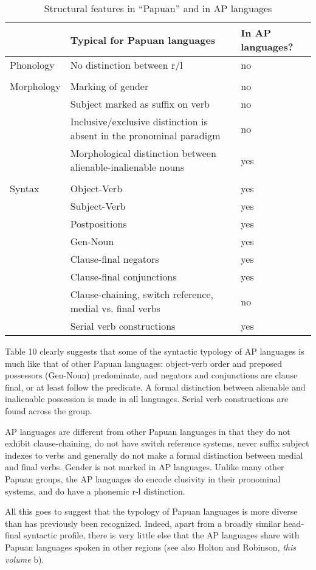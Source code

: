 \begin{table}
\begin{tabular}{lp{4cm}p{4cm}} & {Typical for Papuan languages} & { In AP languages?}\\
\hline
Phonology & No distinction between r/l & no \\
\\
Morphology & Marking of gender & no\\
& Subject marked as suffix on verb & no\\
& Inclusive/exclusive distinction is absent in the pronominal paradigm & no\\
& Morphological distinction between alienable-inalienable nouns & yes\\
\\
Syntax & Object-Verb & yes\\
& Subject-Verb & yes\\
& Postpositions & yes\\
& Gen-Noun & yes\\
& Clause-final negators & yes\\
& Clause-final conjunctions & yes\\
& Clause-chaining, switch reference, medial vs.  final verbs & no \\
& Serial verb constructions & yes\\
\end{tabular}
\caption{Structural features in ``Papuan'' and in AP languages}
\end{table}

Table 10 clearly suggests that some of the syntactic typology of AP languages is much like that of other Papuan languages: object-verb order and preposed possessors (Gen-Noun) predominate, and negators and conjunctions are clause final, or at least follow the predicate. A formal distinction between alienable and inalienable possession is made in all languages. Serial verb constructions are found across the group.

AP languages are different from other Papuan languages in that they do not exhibit clause-chaining, do not have switch reference systems, never suffix subject indexes to verbs and generally do not make a formal distinction between medial and final verbs. Gender is not marked in AP languages. Unlike many other Papuan groups, the AP languages do encode clusivity in their pronominal systems, and do have a phonemic r-l distinction.

All this goes to suggest that the typology of Papuan languages is more diverse than has previously been recognized. Indeed, apart from a broadly similar head-final syntactic profile, there is very little else that the AP languages share with Papuan languages spoken in other regions (see also Holton and Robinson, \textit{this volume} b).

